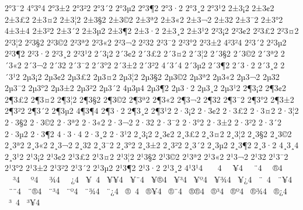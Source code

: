 {2^^b03^^af2
4^^b03^^b04
2^^b03^^b12
2^^b03^^b22
2^^b03^^b42
2^^b03^^b52
2^^b03^^b62
2^^b03^^b72
2^^b03^^b82
2^^b03^^b92
2^^b13^^a12
2^^b13^^a22
2^^b13^^a32
2^^b13^^a42
2^^b13^^a62
2^^b13^^a72
2^^b13^^a92
2^^b13^^aa2
2^^b13^^ab2
2^^b13^^ac2
2^^b13^^ad2
2^^b13^^af2
2^^b13^^b02
4^^b13^^b14
2^^b13^^b22
2^^b13^^b42
2^^b13^^b52
2^^b13^^b62
2^^b13^^b72
2^^b13^^b82
2^^b13^^b92
2^^b23^^a12
2^^b23^^a22
2^^b23^^a32
2^^b23^^a42
2^^b23^^a62
2^^b23^^a72
2^^b23^^a92
2^^b23^^aa2
2^^b23^^ab2
2^^b23^^ac2
2^^b23^^ad2
2^^b23^^af2
2^^b23^^b02
2^^b23^^b12
4^^b23^^b24
2^^b23^^b42
2^^b23^^b52
2^^b23^^b62
2^^b23^^b72
2^^b23^^b82
2^^b23^^b92
2^^b43^^a12
2^^b43^^a22
2^^b43^^a32
2^^b43^^a42
2^^b43^^a62
2^^b43^^a72
2^^b43^^a92
2^^b43^^aa2
2^^b43^^ab2
2^^b43^^ac2
2^^b43^^ad2
2^^b43^^af2
2^^b43^^b02
2^^b43^^b12
2^^b43^^b22
4^^b43^^b44
2^^b43^^b52
2^^b43^^b62
2^^b43^^b72
2^^b43^^b82
2^^b43^^b92
2^^b53^^a12
2^^b53^^a22
2^^b53^^a32
2^^b53^^a42
2^^b53^^a62
2^^b53^^a72
2^^b53^^a92
2^^b53^^aa2
2^^b53^^ab2
2^^b53^^ac2
2^^b53^^ad2
2^^b53^^af2
2^^b53^^b02
2^^b53^^b12
2^^b53^^b22
2^^b53^^b42
4^^b53^^b54
2^^b53^^b62
2^^b53^^b72
2^^b53^^b82
2^^b53^^b92
2^^b63^^a12
2^^b63^^a22
2^^b63^^a32
2^^b63^^a42
2^^b63^^a62
2^^b63^^a72
2^^b63^^a92
2^^b63^^aa2
2^^b63^^ab2
2^^b63^^ac2
2^^b63^^ad2
2^^b63^^af2
2^^b63^^b02
2^^b63^^b12
2^^b63^^b22
2^^b63^^b42
2^^b63^^b52
4^^b63^^b64
2^^b63^^b72
2^^b63^^b82
2^^b63^^b92
2^^b73^^a12
2^^b73^^a22
2^^b73^^a32
2^^b73^^a42
2^^b73^^a62
2^^b73^^a72
2^^b73^^a92
2^^b73^^aa2
2^^b73^^ab2
2^^b73^^ac2
2^^b73^^ad2
2^^b73^^af2
2^^b73^^b02
2^^b73^^b12
2^^b73^^b22
2^^b73^^b42
2^^b73^^b52
2^^b73^^b62
4^^b73^^b74
2^^b73^^b82
2^^b73^^b92
2^^b83^^a12
2^^b83^^a22
2^^b83^^a32
2^^b83^^a42
2^^b83^^a62
2^^b83^^a72
2^^b83^^a92
2^^b83^^aa2
2^^b83^^ab2
2^^b83^^ac2
2^^b83^^ad2
2^^b83^^af2
2^^b83^^b02
2^^b83^^b12
2^^b83^^b22
2^^b83^^b42
2^^b83^^b52
2^^b83^^b62
2^^b83^^b72
4^^b83^^b84
2^^b83^^b92
2^^b93^^a12
2^^b93^^a22
2^^b93^^a32
2^^b93^^a42
2^^b93^^a62
2^^b93^^a72
2^^b93^^a92
2^^b93^^aa2
2^^b93^^ab2
2^^b93^^ac2
2^^b93^^ad2
2^^b93^^af2
2^^b93^^b02
2^^b93^^b12
2^^b93^^b22
2^^b93^^b42
2^^b93^^b52
2^^b93^^b62
2^^b93^^b72
2^^b93^^b82
4^^b93^^b94
^^a0^^a0^^a04
^^a0^^a0^^a54
^^a0^^a0^^a84
^^a0^^a0^^ae4
^^a0^^a0^^b34
^^a0^^a0^^ba4
^^a0^^a0^^be4
^^a0^^a0^^bf4
^^a0^^a5^^a04
^^a0^^a5^^a54
^^a0^^a5^^a84
^^a0^^a5^^ae4
^^a0^^a5^^b34
^^a0^^a5^^ba4
^^a0^^a5^^be4
^^a0^^a5^^bf4
^^a0^^a8^^a04
^^a0^^a8^^a54
^^a0^^a8^^a84
^^a0^^a8^^ae4
^^a0^^a8^^b34
^^a0^^a8^^ba4
^^a0^^a8^^be4
^^a0^^a8^^bf4
^^a0^^ae^^a04
^^a0^^ae^^a54
^^a0^^ae^^a84
^^a0^^ae^^ae4
^^a0^^ae^^b34
^^a0^^ae^^ba4
^^a0^^ae^^be4
^^a0^^ae^^bf4
^^a0^^b3^^a04
^^a0^^b3^^a54
}
